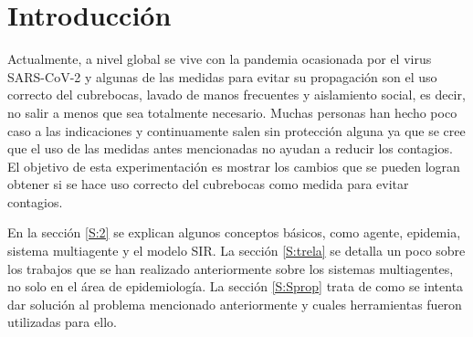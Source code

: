 \documentclass[final,6p,times,twocolumn]{elsarticle}
\begin{document}

\section{Introducción}
Actualmente, a nivel global se vive con la pandemia ocasionada por el virus SARS-CoV-2 y algunas de las medidas para evitar su propagación son el uso correcto del cubrebocas, lavado de manos frecuentes y aislamiento social, es decir, no salir a menos que sea totalmente necesario. Muchas personas han hecho poco caso a las indicaciones y continuamente salen sin protección alguna ya que se cree que el uso de las medidas antes mencionadas no ayudan a reducir los contagios. El objetivo de esta experimentación es mostrar los cambios que se pueden logran obtener si se hace uso correcto del cubrebocas como medida para evitar contagios.

En la sección \ref{S:2} se explican algunos conceptos básicos, como agente, epidemia, sistema multiagente y el modelo SIR. La sección \ref{S:trela} se detalla un poco sobre los trabajos que se han realizado anteriormente sobre los sistemas multiagentes, no solo en el área de epidemiología. La sección \ref{S:Sprop} trata de como se intenta dar solución al problema mencionado anteriormente y cuales herramientas fueron utilizadas para ello. 

\label{S:1}


%





\end{document}
